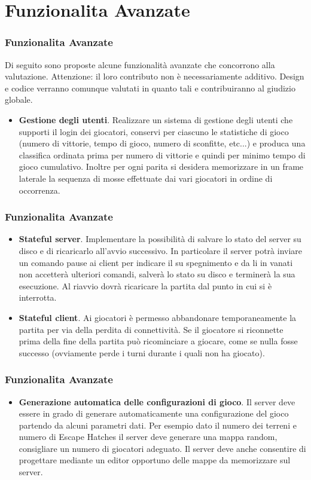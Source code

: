 \documentclass{beamer}
\begin{document}
\section{Funzionalita Avanzate}
\begin{frame}
\frametitle{Funzionalita Avanzate}

Di seguito sono proposte alcune funzionalit\`a avanzate che concorrono alla valutazione.  Attenzione: il loro contributo non \`e  necessariamente additivo. Design e codice verranno comunque valutati in quanto tali e contribuiranno al giudizio globale.

\begin{itemize}
\item \textbf{Gestione degli utenti}. Realizzare un sistema di
  gestione degli utenti che supporti il login dei giocatori, conservi
  per ciascuno le statistiche di gioco (numero di vittorie, tempo di
  gioco, numero di sconfitte, etc...) e produca una classifica
  ordinata prima per numero di vittorie e quindi per minimo tempo di
  gioco cumulativo. Inoltre per ogni parita si desidera
  memorizzare in un frame laterale la sequenza di mosse effettuate dai
  vari giocatori in ordine di occorrenza.
\end{itemize}
\end{frame}

\begin{frame}
\frametitle{Funzionalita Avanzate}
\begin{itemize}
\item  \textbf{Stateful server}. Implementare la possibilit\`a di
  salvare lo stato del server su disco e di ricaricarlo all'avvio
  successivo. In particolare il server potr\`a inviare un comando
  pause ai client per indicare il su spegnimento e da li in vanati non
  accetter\`a ulteriori comandi, salver\`a lo stato su disco e
  terminer\`a la sua esecuzione. Al riavvio dovr\`a ricaricare la
  partita dal punto in cui si \`e interrotta.  
\item \textbf{Stateful client}. Ai giocatori \`e permesso abbandonare
  temporaneamente la partita per via della perdita di connettivit\`a.
  Se il giocatore si riconnette prima della fine della partita pu\`o
  ricominciare a giocare, come se nulla fosse successo (ovviamente
  perde i turni durante i quali non ha giocato).
\end{itemize}

\end{frame}

\begin{frame}
\frametitle{Funzionalita Avanzate}
\begin{itemize}
\item \textbf{Generazione automatica delle configurazioni di
    gioco}. Il server deve essere in grado di generare automaticamente
  una configurazione del gioco partendo da alcuni parametri dati. Per
  esempio dato il numero dei terreni e numero di Escape Hatches il
  server deve generare una mappa random, consigliare un numero di
  giocatori adeguato. Il server deve anche consentire di progettare
  mediante un editor opportuno delle mappe da memorizzare sul server.
\end{itemize}

\end{frame}
\end{document}
